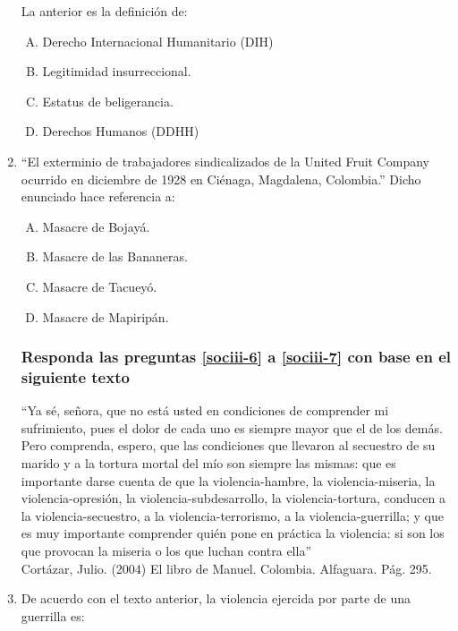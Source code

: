 \begin{enumerate}
La anterior es la definición de:\label{sociii-2}


\begin{enumerate}[(A)]
\item   Derecho Internacional Humanitario (DIH)
 \item  Legitimidad insurreccional.
\item Estatus de beligerancia.
\item Derechos Humanos (DDHH)
\end{enumerate}



\newpage

\item  ``El exterminio de trabajadores sindicalizados de la United Fruit Company ocurrido en diciembre de 1928 en Ciénaga, Magdalena, Colombia.'' Dicho enunciado hace referencia a:\label{sociii-5}


\begin{enumerate}[(A)]
\item   Masacre de Bojayá.
 \item  Masacre de las Bananeras.
\item Masacre de Tacueyó.
\item Masacre de Mapiripán.
\end{enumerate}



\subsubsection*{Responda las preguntas \ref{sociii-6} a \ref{sociii-7} con base en el siguiente texto}

``Ya sé, señora, que no está usted en condiciones de comprender mi sufrimiento, pues el dolor de cada uno es siempre mayor que el de los demás. Pero comprenda, espero, que las condiciones que llevaron al secuestro de su marido y a la tortura mortal del mío son siempre las mismas: que es importante darse cuenta de que la violencia-hambre, la violencia-miseria, la violencia-opresión, la violencia-subdesarrollo, la violencia-tortura, conducen a la violencia-secuestro, a la violencia-terrorismo, a la violencia-guerrilla; y que es muy importante comprender quién pone en práctica la violencia: si son los que provocan la miseria o los que luchan contra ella'' \\ {\footnotesize Cortázar, Julio. (2004) El libro de Manuel. Colombia. Alfaguara. Pág. 295.}

\newpage
\item De acuerdo con el texto anterior, la violencia ejercida por parte de una guerrilla es:\label{sociii-6}



\end{enumerate}
